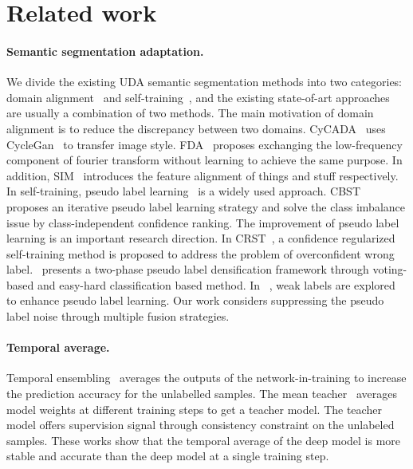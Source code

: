 \documentclass{bmvc2k}
\begin{document}
\section{Related work}

\paragraph{Semantic segmentation adaptation.} We divide the existing UDA semantic segmentation methods into two categories: domain alignment~\cite{hoffman2018cycada,RN180,RN138,RN135} and self-training~\cite{RN162,zou2019confidence,shin2020two,paul2020domain,pan2020unsupervised}, and the existing state-of-art approaches are usually a combination of two methods. The main motivation of domain alignment is to reduce the discrepancy between two domains. CyCADA~\cite{hoffman2018cycada} uses CycleGan~\cite{zhu2017unpaired} to transfer image style. FDA~\cite{RN180} proposes exchanging the low-frequency component of fourier transform without learning to achieve the same purpose. In addition, SIM~\cite{RN135} introduces the feature alignment of things and stuff respectively. In self-training, pseudo label learning~\cite{RN162} is a widely used approach. CBST~\cite{RN162} proposes an iterative pseudo label learning strategy and solve the class imbalance issue by class-independent confidence ranking. The improvement of pseudo label learning is an important research direction. In CRST~\cite{zou2019confidence}, a confidence regularized self-training method is proposed to address the problem of overconfident wrong label.~\cite{shin2020two} presents a two-phase pseudo label densification framework through voting-based and  easy-hard classification based method. In ~\cite{paul2020domain}, weak labels are explored to enhance pseudo label learning. Our work considers suppressing the pseudo label noise through multiple fusion strategies.

\paragraph{Temporal average.} Temporal ensembling~\cite{laine2016temporal} averages the outputs of the network-in-training to increase the prediction accuracy for the unlabelled samples. The mean teacher~\cite{tarvainen2017mean} averages model weights at different training steps to get a teacher model. The teacher model offers supervision signal through consistency constraint on the unlabeled samples. These works show that the temporal average of the deep model is more stable and accurate than the deep model at a single training step.
\end{document}
